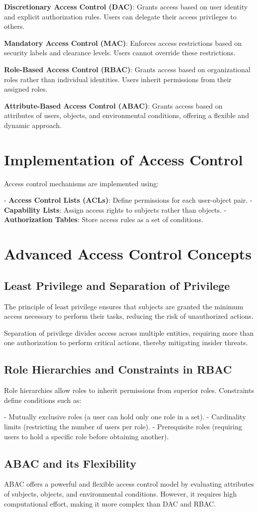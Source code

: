 \textbf{Discretionary Access Control (DAC)}: Grants access based on user
identity and explicit authorization rules. Users can delegate their access
privileges to others.

\textbf{Mandatory Access Control (MAC)}: Enforces access restrictions based on
security labels and clearance levels. Users cannot override these restrictions.

\textbf{Role-Based Access Control (RBAC)}: Grants access based on
organizational roles rather than individual identities. Users inherit
permissions from their assigned roles.

\textbf{Attribute-Based Access Control (ABAC)}: Grants access based on
attributes of users, objects, and environmental conditions, offering a flexible
and dynamic approach.

\section{Implementation of Access Control}
Access control mechanisms are implemented using:

- \textbf{Access Control Lists (ACLs)}: Define permissions for each user-object
pair.
- \textbf{Capability Lists}: Assign access rights to subjects rather than
objects.
- \textbf{Authorization Tables}: Store access rules as a set of conditions.

\section{Advanced Access Control Concepts}
\subsection{Least Privilege and Separation of Privilege}
The principle of least privilege ensures that subjects are granted the minimum
access necessary to perform their tasks, reducing the risk of unauthorized
actions.

Separation of privilege divides access across multiple entities, requiring more
than one authorization to perform critical actions, thereby mitigating insider
threats.

\subsection{Role Hierarchies and Constraints in RBAC}
Role hierarchies allow roles to inherit permissions from superior roles.
Constraints define conditions such as:

- Mutually exclusive roles (a user can hold only one role in a set).
- Cardinality limits (restricting the number of users per role).
- Prerequisite roles (requiring users to hold a specific role before obtaining
another).

\subsection{ABAC and its Flexibility}
ABAC offers a powerful and flexible access control model by evaluating
attributes of subjects, objects, and environmental conditions. However, it
requires high computational effort, making it more complex than DAC and RBAC.

